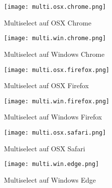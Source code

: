 
\begin{figure}[!htb]
    \centering
    \begin{minipage}[b]{0.45\textwidth}
        \centering
        \texttt{[image: multi.osx.chrome.png]}
        \caption{\centering Multiselect auf OSX Chrome}
        \label{img:multiOsxChromeSelect}
    \end{minipage}
    \hfill
    \begin{minipage}[b]{0.45\textwidth}
        \centering
        \texttt{[image: multi.win.chrome.png]}
        \caption{\centering Multiselect auf Windows Chrome}
        \label{img:multiWinChromeSelect}
    \end{minipage}
\end{figure}

\begin{figure}[!htb]
    \centering
    \begin{minipage}[b]{0.45\textwidth}
        \centering
        \texttt{[image: multi.osx.firefox.png]}
        \caption{\centering Multiselect auf OSX Firefox}
        \label{img:multiOsxFirefoxSelect}
    \end{minipage}
    \hfill
    \begin{minipage}[b]{0.45\textwidth}
        \centering
        \texttt{[image: multi.win.firefox.png]}
        \caption{\centering Multiselect auf Windows Firefox}
        \label{img:multiWinFirefoxSelect}
    \end{minipage}
\end{figure}

\begin{figure}[!htb]
    \centering
    \begin{minipage}[b]{0.45\textwidth}
        \centering
        \texttt{[image: multi.osx.safari.png]}
        \caption{\centering Multiselect auf OSX Safari}
        \label{img:multiOsxSafariSelect}
    \end{minipage}
    \hfill
    \begin{minipage}[b]{0.45\textwidth}
        \centering
        \texttt{[image: multi.win.edge.png]}
        \caption{\centering Multiselect auf Windows Edge}
        \label{img:multiWinEdgeSelect}
    \end{minipage}
\end{figure}


